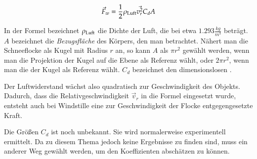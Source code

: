 \begin{equation}
\label{eq:implementation_snowflake_drag_equation}
\vec{F}_w = \frac{1}{2} \rho_{\textnormal{Luft}} \vec{v_r^2} C_d A
\end{equation}

In der Formel bezeichnet $\rho_{\textnormal{Luft}}$ die Dichte
der Luft, die bei  etwa $1.293\frac{kg}{m^3}$
beträgt. $A$ bezeichnet die \emph{Bezugsfläche} des Körpers, den man
betrachtet. Nähert man die Schneeflocke als Kugel mit Radius $r$ an,
so kann $A$ als $\pi r^2$ gewählt werden, wenn man die Projektion der
Kugel auf die Ebene als Referenz wählt, oder $2\pi r^2$, wenn man die
 der Kugel als Referenz wählt. $C_d$
bezeichnet den dimensionslosen
.

Der Luftwiderstand wächst also quadratisch zur Geschwindigkeit des
Objekts. Dadurch, dass die Relativgeschwindigkeit $\vec{v}_r$ in die
Formel eingesetzt wurde, entsteht auch bei Windstille eine zur
Geschwindigkeit der Flocke entgegengesetzte Kraft.

Die Größen $C_d$ ist noch unbekannt. Sie wird normalerweise
experimentell ermittelt. Da zu diesem Thema jedoch keine Ergebnisse zu
finden sind, muss ein anderer Weg gewählt werden, um den Koeffizienten
abschätzen zu können.

